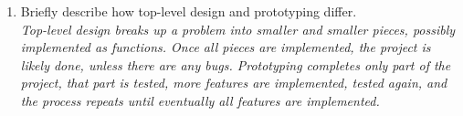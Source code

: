 \documentclass[letter,10pt]{article}
\begin{document}
\begin{enumerate}
    \item Briefly describe how top-level design and prototyping differ. \\
    \textit{Top-level design breaks up a problem into smaller and smaller pieces, possibly implemented as functions. Once all pieces are implemented, the project is likely done, unless there are any bugs. Prototyping completes only part of the project, that part is tested, more features are implemented, tested again, and the process repeats until eventually all features are implemented.}
    
\end{enumerate}
\end{document}
